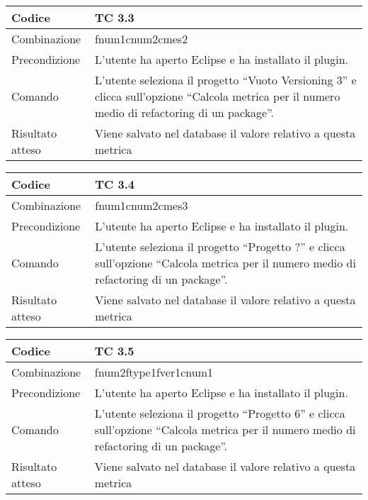 \begin{table}[ht]
\begin{tabular}{|p{3cm}|p{9cm}|}
\hline
\cellcolor{lightgray}Codice				& TC 3.3								\\
\hline
\cellcolor{lightgray}Combinazione		& fnum1cnum2cmes2									\\
\hline
\cellcolor{lightgray}Precondizione		& L'utente ha aperto Eclipse e ha installato il plugin.					\\
\hline
\cellcolor{lightgray}Comando			& L'utente seleziona il progetto ``Vuoto Versioning 3''  e clicca sull'opzione ``Calcola metrica per il numero medio di refactoring di un package''.	\\
\hline
\cellcolor{lightgray}Risultato atteso	& Viene salvato nel database il valore relativo a questa metrica	\\
\hline
\end{tabular}
\end{table}

\begin{table}[ht]
\begin{tabular}{|p{3cm}|p{9cm}|}
\hline
\cellcolor{lightgray}Codice				& TC 3.4								\\
\hline
\cellcolor{lightgray}Combinazione		& fnum1cnum2cmes3									\\
\hline
\cellcolor{lightgray}Precondizione		& L'utente ha aperto Eclipse e ha installato il plugin.			\\
\hline
\cellcolor{lightgray}Comando			& L'utente seleziona il progetto ``Progetto ?''  e clicca sull'opzione ``Calcola metrica per il numero medio di refactoring di un package''.	\\
\hline
\cellcolor{lightgray}Risultato atteso	& Viene salvato nel database il valore relativo a questa metrica	\\
\hline
\end{tabular}
\end{table}

\begin{table}[ht]
\begin{tabular}{|p{3cm}|p{9cm}|}
\hline
\cellcolor{lightgray}Codice				& TC 3.5								\\
\hline
\cellcolor{lightgray}Combinazione		& fnum2ftype1fver1cnum1 									\\
\hline
\cellcolor{lightgray}Precondizione		& L'utente ha aperto Eclipse e ha installato il plugin.			\\
\hline
\cellcolor{lightgray}Comando			& L'utente seleziona il progetto ``Progetto 6''  e clicca sull'opzione ``Calcola metrica per il numero medio di refactoring di un package''.	\\
\hline
\cellcolor{lightgray}Risultato atteso	& Viene salvato nel database il valore relativo a questa metrica	\\
\hline
\end{tabular}
\end{table}

